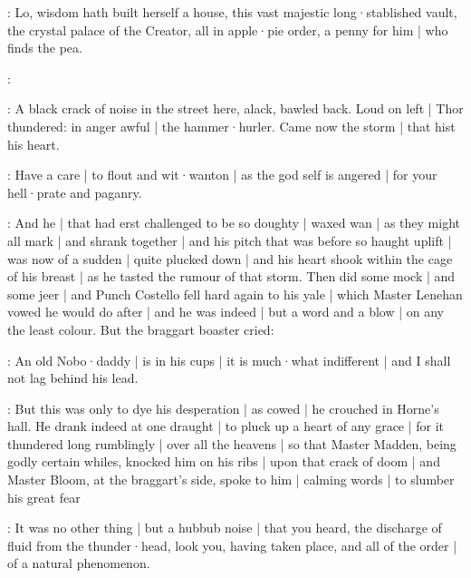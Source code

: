 \stephen:
Lo,
wisdom hath built herself a house,
this vast majestic long·stablished vault,
the crystal palace of the Creator,
all in apple·pie order,
a penny for him |
who finds the pea.

\stephen:




:
A black crack of noise in the street here,
alack,
bawled back.
Loud on left |
Thor thundered:
in anger awful |
the hammer·hurler.
Came now the storm |
that hist his heart.

\lynch:
Have a care |
to flout and wit·wanton |
as the god self is angered |
for your hell·prate and paganry.

:
And he |
that had erst challenged to be so doughty |
waxed wan |
as they might all mark |
and shrank together |
and his pitch that was before so haught uplift |
was now of a sudden |
quite plucked down |
and his heart shook within the cage of his breast |
as he tasted the rumour of that storm.
Then did some mock |
and some jeer |
and Punch Costello fell hard again to his yale |
which Master Lenehan vowed he would do after |
and he was indeed |
but a word and a blow |
on any the least colour.
But the braggart boaster cried:

\stephen:
An old Nobo·daddy |
is in his cups |
it is much·what indifferent |
and I shall not lag behind his lead.

:
But this was only to dye his desperation |
as cowed |
he crouched in Horne's hall.
He drank indeed at one draught |
to pluck up a heart of any grace |
for it thundered long rumblingly |
over all the heavens |
so that Master Madden,
being godly certain whiles,
knocked him on his ribs |
upon that crack of doom |
and Master Bloom,
at the braggart's side,
spoke to him |
calming words |
to slumber his great fear

\Bloom:
It was no other thing |
but a hubbub noise |
that you heard,
the discharge of fluid from the thunder·head,
look you,
having taken place,
and all of the order |
of a natural phenomenon.



